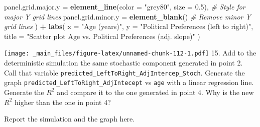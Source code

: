 \documentclass[
]{book}
\newenvironment{Shaded}{\begin{snugshade}}{\end{snugshade}}
\newcommand{\AttributeTok}[1]{\textcolor[rgb]{0.13,0.29,0.53}{#1}}
\newcommand{\CommentTok}[1]{\textcolor[rgb]{0.56,0.35,0.01}{\textit{#1}}}
\newcommand{\FloatTok}[1]{\textcolor[rgb]{0.00,0.00,0.81}{#1}}
\newcommand{\FunctionTok}[1]{\textcolor[rgb]{0.13,0.29,0.53}{\textbf{#1}}}
\newcommand{\NormalTok}[1]{#1}
\newcommand{\SpecialCharTok}[1]{\textcolor[rgb]{0.81,0.36,0.00}{\textbf{#1}}}
\newcommand{\StringTok}[1]{\textcolor[rgb]{0.31,0.60,0.02}{#1}}
\begin{document}
\begin{Shaded}
\begin{Highlighting}[]
    \AttributeTok{panel.grid.major.y =} \FunctionTok{element\_line}\NormalTok{(}\AttributeTok{color =} \StringTok{"grey80"}\NormalTok{, }\AttributeTok{size =} \FloatTok{0.5}\NormalTok{), }\CommentTok{\# Style for major Y grid lines}
    \AttributeTok{panel.grid.minor.y =} \FunctionTok{element\_blank}\NormalTok{() }\CommentTok{\# Remove minor Y grid lines}
\NormalTok{  ) }\SpecialCharTok{+}
  \FunctionTok{labs}\NormalTok{(}
    \AttributeTok{x =} \StringTok{"Age (years)"}\NormalTok{,}
    \AttributeTok{y =} \StringTok{"Political Preferences (left to right)"}\NormalTok{,}
    \AttributeTok{title =} \StringTok{"Scatter plot Age vs. Political Preferences (adj. slope)"}
\NormalTok{  )}
\end{Highlighting}
\end{Shaded}

\texttt{[image: \_main\_files/figure-latex/unnamed-chunk-112-1.pdf]}
15. Add to the deterministic simulation the same stochastic component generated in point 2. Call that variable \texttt{predicted\_LeftToRight\_AdjIntercep\_Stoch}. Generate the graph \texttt{predicted\_LeftToRight\_AdjIntecept} vs \texttt{age} with a linear regression line. Generate the \(R^2\) and compare it to the one generated in point 4. Why is the new \(R^2\) higher than the one in point 4?

Report the simulation and the graph here.
\end{document}
